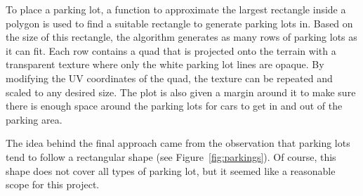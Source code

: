 To place a parking lot, a function to approximate the largest rectangle inside a polygon is used to find a suitable rectangle to generate parking lots in.
Based on the size of this rectangle, the algorithm generates as many rows of parking lots as it can fit.
Each row contains a quad that is projected onto the terrain with a transparent texture where only the white parking lot lines are opaque.
By modifying the UV coordinates of the quad, the texture can be repeated and scaled to any desired size. 
The plot is also given a margin around it to make sure there is enough space around the parking lots for cars to get in and out of the parking area.

The idea behind the final approach came from the observation that parking lots tend to follow a rectangular shape (see Figure~\ref{fig:parkings}).
Of course, this shape does not cover all types of parking lot, but it seemed like a reasonable scope for this project.

